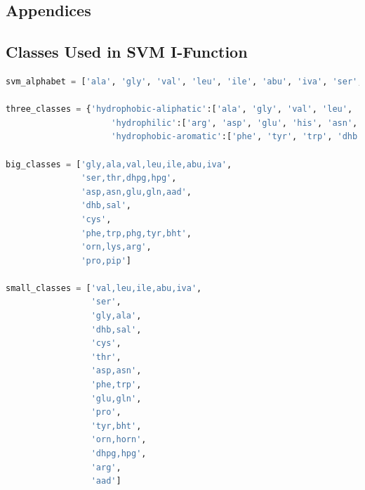 \documentclass{l4proj}
\begin{document}
\begin{appendices}

\chapter{Appendices}

\section{Classes Used in SVM I-Function} \label{svmclasses}

\begin{lstlisting}[language=python, float, caption={Classes used for SVM-I Function. Any exact match evaluates to 1.0. A small-class match evaluates to 0.75, a large-class match evaluates to 0.5, a three-class match evaluates to 0.25, and it evaluates to 0 otherwise.}, label=lst:svmclasses]
svm_alphabet = ['ala', 'gly', 'val', 'leu', 'ile', 'abu', 'iva', 'ser', 'thr', 'hpg', 'dhpg', 'cys', 'pro', 'pip', 'arg', 'asp', 'glu', 'his', 'asn', 'lys', 'gln', 'orn', 'aad', 'phe', 'tyr', 'trp', 'dhb', 'phg', 'bht']
		
three_classes = {'hydrophobic-aliphatic':['ala', 'gly', 'val', 'leu', 'ile', 'abu', 'iva', 'ser', 'thr', 'hpg', 'dhpg', 'cys', 'pro', 'pip'],
                 	 'hydrophilic':['arg', 'asp', 'glu', 'his', 'asn', 'lys', 'gln', 'orn', 'aad'],
                 	 'hydrophobic-aromatic':['phe', 'tyr', 'trp', 'dhb', 'phg', 'bht']}

big_classes = ['gly,ala,val,leu,ile,abu,iva',
			   'ser,thr,dhpg,hpg', 
			   'asp,asn,glu,gln,aad', 
			   'dhb,sal', 
			   'cys', 
			   'phe,trp,phg,tyr,bht', 
			   'orn,lys,arg', 
			   'pro,pip']

small_classes = ['val,leu,ile,abu,iva', 
				 'ser', 
				 'gly,ala', 
				 'dhb,sal', 
				 'cys', 
				 'thr', 
				 'asp,asn', 
				 'phe,trp', 
				 'glu,gln', 
				 'pro', 
				 'tyr,bht', 
				 'orn,horn', 
				 'dhpg,hpg', 
				 'arg', 
				 'aad']
\end{lstlisting}

\end{appendices}







\listoffigures

\end{document}
